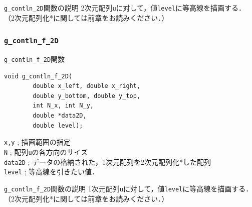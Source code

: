 \documentclass[platex,a4paper,12pt]{jsarticle}%
\begin{document}
\begin{itembox}[l]{\texttt{g\_contln\_2D}関数の説明}
2次元配列\verb|u|に対して，値\verb|level|に等高線を描画する．
（2次元配列化*に関しては前章をお読みください．）
\end{itembox}

\begin{figure}[htb]
\end{figure}




\clearpage
\subsubsection{\texttt{g\_contln\_f\_2D}}

\begin{itembox}[l]{\texttt{g\_contln\_f\_2D}関数}
\begin{verbatim}
void g_contln_f_2D(
        double x_left, double x_right,
        double y_bottom, double y_top,
        int N_x, int N_y,
        double *data2D,
        double level);
\end{verbatim}
\verb|x,y| ; 描画範囲の指定\\
\verb|N| ; 配列\verb|u|の各方向のサイズ\\
\verb|data2D| ; データの格納された，1次元配列を2次元配列化*した配列\\
\verb|level| ; 等高線を引きたい値．
\end{itembox}

\begin{itembox}[l]{\texttt{g\_contln\_f\_2D}関数の説明}
1次元配列\verb|u|に対して，値\verb|level|に等高線を描画する．
（2次元配列化*に関しては前章をお読みください．）
\end{itembox}
\end{document}
